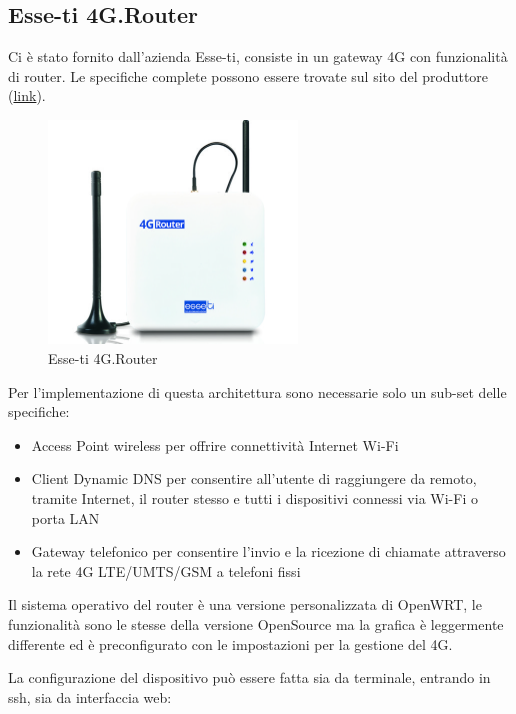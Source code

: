 \subsection{Esse-ti 4G.Router \workinprogress}

Ci è stato fornito dall'azienda Esse-ti, consiste in un gateway 4G con funzionalità di router. Le specifiche complete possono essere trovate sul sito del produttore (\href{https://www.esse-ti.it/4g-router}{link}).


\begin{figure}[ht]
	\centering
	\includegraphics[width=250px]{immagini/4grouter.jpg}
	\caption{Esse-ti 4G.Router}
	\label{fig:esse-ti-router-4g}
\end{figure}

Per l'implementazione di questa architettura sono necessarie solo un sub-set delle specifiche:


\begin{itemize}
	\item Access Point wireless per offrire connettività Internet Wi-Fi
 
	\item Client Dynamic DNS per consentire all’utente di raggiungere da remoto, tramite Internet, il router stesso e tutti i dispositivi connessi via Wi-Fi o porta LAN
	
	\item Gateway telefonico per consentire l’invio e la ricezione di chiamate attraverso la rete 4G LTE/UMTS/GSM a telefoni fissi
\end{itemize}


Il sistema operativo del router è una versione personalizzata di OpenWRT, le funzionalità sono le stesse della versione OpenSource ma la grafica è leggermente differente ed è preconfigurato con le impostazioni per la gestione del 4G.

La configurazione del dispositivo può essere fatta sia da terminale, entrando in ssh, sia da interfaccia web:

